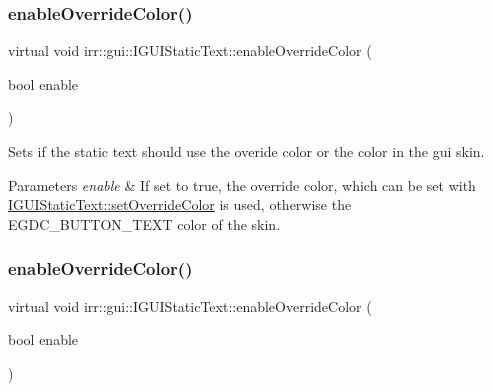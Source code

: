 \subsubsection{\texorpdfstring{enable\+Override\+Color()}{enableOverrideColor()}\hspace{0.1cm}{\footnotesize\ttfamily [1/2]}}
{\footnotesize\ttfamily virtual void irr\+::gui\+::\+I\+G\+U\+I\+Static\+Text\+::enable\+Override\+Color (\begin{DoxyParamCaption}\item[{bool}]{enable }\end{DoxyParamCaption})\hspace{0.3cm}{\ttfamily [pure virtual]}}



Sets if the static text should use the overide color or the color in the gui skin. 


\begin{DoxyParams}{Parameters}
{\em enable} & If set to true, the override color, which can be set with \hyperlink{classirr_1_1gui_1_1IGUIStaticText_aadc1f0e10e4b298944e6dcfd49e54009}{I\+G\+U\+I\+Static\+Text\+::set\+Override\+Color} is used, otherwise the E\+G\+D\+C\+\_\+\+B\+U\+T\+T\+O\+N\+\_\+\+T\+E\+XT color of the skin. \\
\hline
\end{DoxyParams}
\mbox{\label{classirr_1_1gui_1_1IGUIStaticText_ae1f432263d4c638b0441f8b993f301bc}} 
\subsubsection{\texorpdfstring{enable\+Override\+Color()}{enableOverrideColor()}\hspace{0.1cm}{\footnotesize\ttfamily [2/2]}}
{\footnotesize\ttfamily virtual void irr\+::gui\+::\+I\+G\+U\+I\+Static\+Text\+::enable\+Override\+Color (\begin{DoxyParamCaption}\item[{bool}]{enable }\end{DoxyParamCaption})\hspace{0.3cm}{\ttfamily [pure virtual]}}




